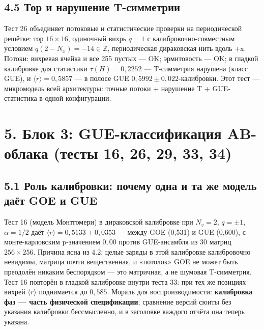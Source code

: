 \documentclass[
]{article}
\begin{document}
\subsection{4.5 Тор и нарушение
T-симметрии}\label{ux442ux43eux440-ux438-ux43dux430ux440ux443ux448ux435ux43dux438ux435-t-ux441ux438ux43cux43cux435ux442ux440ux438ux438}

Тест 26 объединяет потоковые и статистические проверки на периодической
решётке: тор \(16\times16\), одиночный вихрь \(q=1\) с
калибровочно-совместным условием \(q(2-N_x) = -14\in\mathbb{Z}\),
периодическая дираковская нить вдоль +x. Потоки: вихревая ячейка и все
255 пустых --- OK; эрмитовость --- OK; в гладкой калибровке для
статистики \(\tau(H) = 0{,}2252\) --- T-симметрия нарушена (класс GUE),
и \(\langle r\rangle = 0{,}5857\) --- в полосе GUE
\(0{,}5992\pm0{,}022\)-калибровки. Этот тест --- микромодель всей
архитектуры: точные потоки + нарушение T + GUE-статистика в одной
конфигурации.

\section{5. Блок 3: GUE-классификация AB-облака (тесты 16, 26, 29, 33,
34)}\label{ux431ux43bux43eux43a-3-gue-ux43aux43bux430ux441ux441ux438ux444ux438ux43aux430ux446ux438ux44f-ab-ux43eux431ux43bux430ux43aux430-ux442ux435ux441ux442ux44b-16-26-29-33-34}

\subsection{5.1 Роль калибровки: почему одна и та же модель даёт GOE и
GUE}\label{ux440ux43eux43bux44c-ux43aux430ux43bux438ux431ux440ux43eux432ux43aux438-ux43fux43eux447ux435ux43cux443-ux43eux434ux43dux430-ux438-ux442ux430-ux436ux435-ux43cux43eux434ux435ux43bux44c-ux434ux430ux451ux442-goe-ux438-gue}

Тест 16 (модель Монтгомери) в дираковской калибровке при \(N_v=2\),
\(q=\pm1\), \(\alpha=1/2\) даёт
\(\langle r\rangle = 0{,}5133\pm0{,}0353\) --- между GOE (0,531) и GUE
(0,600), с монте-карловским p-значением \(0{,}00\) против GUE-ансамбля
из 30 матриц \(256\times256\). Причина ясна из 4.2: целые заряды в этой
калибровке калибровочно невидимы, матрица почти вещественная, и
«потолок» GOE не может быть преодолён никаким беспорядком --- это
матричная, а не шумовая T-симметрия. Тест 16 повторён в гладкой
калибровке внутри теста 33: при тех же позициях вихрей
\(\langle r\rangle\) поднимается до \(0{,}585\). Мораль для
воспроизводимости: \textbf{калибровка фаз --- часть физической
спецификации}; сравнение версий сюиты без указания калибровки
бессмысленно, и в заголовке каждого отчёта она теперь указана.
\end{document}

